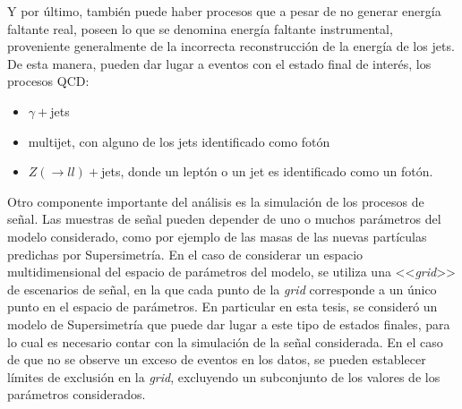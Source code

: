 Y por último, también puede haber procesos que a pesar de no generar energía
faltante real, poseen lo que se denomina energía faltante instrumental,
proveniente generalmente de la incorrecta reconstrucción de la energía de los
jets. De esta manera, pueden dar lugar a eventos con el estado final de interés,
los procesos QCD:

\begin{itemize}
\item $\gamma+$jets
\item multijet, con alguno de los jets identificado como fotón
\item $Z(\to ll)+$jets, donde un leptón o un jet es identificado como un fotón.
\end{itemize}




Otro componente importante del análisis es la simulación de los procesos de
señal. Las muestras de señal pueden depender de uno o muchos parámetros del
modelo considerado, como por ejemplo de las masas de las nuevas partículas
predichas por Supersimetría. En el caso de considerar un espacio
multidimensional del espacio de parámetros del modelo, se utiliza una
<<\emph{grid}>> de escenarios de señal, en la que cada punto de la \emph{grid}
corresponde a un único punto en el espacio de parámetros. En particular en esta
tesis, se consideró un modelo de Supersimetría que puede dar lugar a este tipo
de estados finales, para lo cual es necesario contar con la simulación de la
señal considerada. En el caso de que no se observe un exceso de eventos en los
datos, se pueden establecer límites de exclusión en la \emph{grid}, excluyendo
un subconjunto de los valores de los parámetros considerados.


